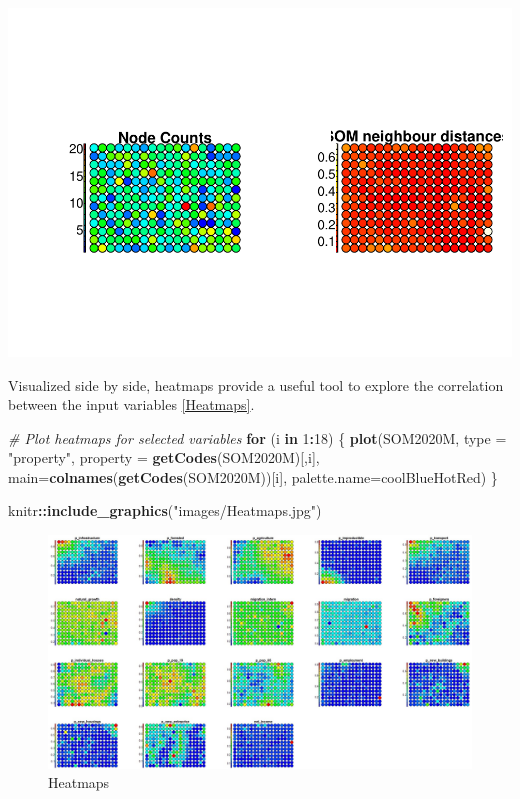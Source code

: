 \documentclass[
]{book}
\newenvironment{Shaded}{\begin{snugshade}}{\end{snugshade}}
\newcommand{\AttributeTok}[1]{\textcolor[rgb]{0.13,0.29,0.53}{#1}}
\newcommand{\CommentTok}[1]{\textcolor[rgb]{0.56,0.35,0.01}{\textit{#1}}}
\newcommand{\ControlFlowTok}[1]{\textcolor[rgb]{0.13,0.29,0.53}{\textbf{#1}}}
\newcommand{\DecValTok}[1]{\textcolor[rgb]{0.00,0.00,0.81}{#1}}
\newcommand{\FunctionTok}[1]{\textcolor[rgb]{0.13,0.29,0.53}{\textbf{#1}}}
\newcommand{\NormalTok}[1]{#1}
\newcommand{\SpecialCharTok}[1]{\textcolor[rgb]{0.81,0.36,0.00}{\textbf{#1}}}
\newcommand{\StringTok}[1]{\textcolor[rgb]{0.31,0.60,0.02}{#1}}
\begin{document}
\includegraphics{05-SOM_files/figure-latex/outputs-SOM-maxmin-1.pdf}

Visualized side by side, heatmaps provide a useful tool to explore the correlation between the input variables \autoref{Heatmaps}.

\begin{Shaded}
\begin{Highlighting}[]
\CommentTok{\# Plot heatmaps for selected variables}
\ControlFlowTok{for}\NormalTok{ (i }\ControlFlowTok{in} \DecValTok{1}\SpecialCharTok{:}\DecValTok{18}\NormalTok{) }
\NormalTok{  \{}
\FunctionTok{plot}\NormalTok{(SOM2020M, }\AttributeTok{type =} \StringTok{"property"}\NormalTok{, }\AttributeTok{property =} \FunctionTok{getCodes}\NormalTok{(SOM2020M)[,i],}
     \AttributeTok{main=}\FunctionTok{colnames}\NormalTok{(}\FunctionTok{getCodes}\NormalTok{(SOM2020M))[i], }\AttributeTok{palette.name=}\NormalTok{coolBlueHotRed)}
\NormalTok{  \}}
\end{Highlighting}
\end{Shaded}

\begin{Shaded}
\begin{Highlighting}[]
\NormalTok{knitr}\SpecialCharTok{::}\FunctionTok{include\_graphics}\NormalTok{(}\StringTok{"images/Heatmaps.jpg"}\NormalTok{)}
\end{Highlighting}
\end{Shaded}

\begin{figure}

{\centering \includegraphics[width=0.7\linewidth,height=0.7\textheight]{images/Heatmaps} 

}

\caption{Heatmaps \label{Heatmaps}}\label{fig:jpg1}
\end{figure}
\end{document}
